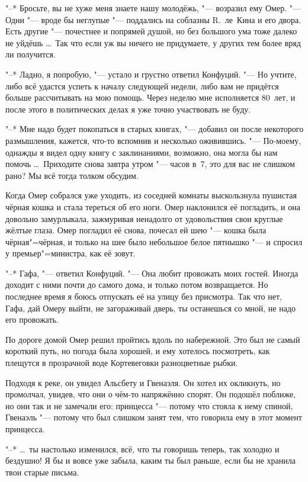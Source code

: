 "--* Бросьте, вы не хуже меня знаете нашу молодёжь, "--- возразил ему Омер.
"--- Одни "--- вроде бы неглупые "--- поддались на соблазны R.~ле~Кина и его
двора.
Есть другие "--- почестнее и попрямей душой, но без большого ума тоже далеко не
уйдёшь \ldots\
Так что если уж вы ничего не придумаете, у других тем более вряд ли получится.

"--* Ладно, я попробую, "--- устало и грустно ответил Конфуций.
"--- Но учтите, либо всё удастся успеть к началу следующей недели, либо вам не
придётся больше рассчитывать на мою помощь.
Через неделю мне исполняется 80~лет, и после этого в политических делах я уже
точно участвовать не буду.

"--* Мне надо будет покопаться в старых книгах, "--- добавил он после некоторого
размышления, кажется, что-то вспомнив и несколько оживившись.
"--- По-моему, однажды я видел одну книгу с заклинаниями, возможно, она могла бы
нам помочь \ldots\
Приходите снова завтра утром "--- часов в~7, это для вас не слишком рано?
Мы всё тогда толком обсудим.

Когда Омер собрался уже уходить, из соседней комнаты выскользнула пушистая
чёрная кошка и стала тереться об его ноги.
Омер наклонился её погладить, и она довольно замурлыкала, зажмуривая ненадолго
от удовольствия свои круглые жёлтые глаза.
Омер погладил её снова, почесал ей шею "--- кошка была чёрная"=чёрная, и только
на шее было небольшое белое пятнышко "--- и спросил у премьер"=министра, как её
зовут.

"--* Гафа, "--- ответил Конфуций.
"--- Она любит провожать моих гостей.
Иногда доходит с ними почти до самого дома, и только потом возвращается.
Но последнее время я боюсь отпускать её на улицу без присмотра.
Так что нет, Гафа, дай Омеру выйти, не загораживай дверь, ты останешься со мной,
не надо его провожать.

По дороге домой Омер решил пройтись вдоль по набережной.
Это был не самый короткий путь, но погода была хорошей, и ему хотелось
посмотреть, как плещутся в прозрачной воде Кортевеговки разноцветные рыбки.

Подходя к реке, он увидел Альсбету и Гвенаэля.
Он хотел их окликнуть, но промолчал, увидев, что они о чём-то напряжённо спорят.
Он подошёл поближе, но они так и не замечали его: принцесса "--- потому что
стояла к нему спиной, Гвенаэль "--- потому что был слишком занят тем, что
говорила ему в этот момент принцесса.

"--* \ldots\ ты настолько изменился, всё, что ты говоришь теперь, так холодно
и бездушно!
Я бы и вовсе уже забыла, каким ты был раньше, если бы не хранила твои старые
письма.

